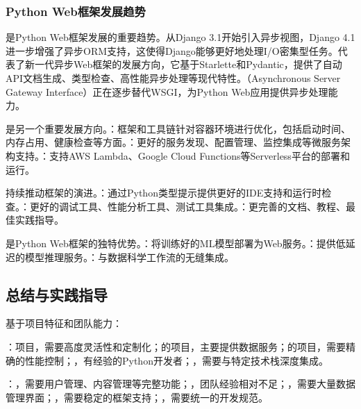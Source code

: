 \hypertarget{python-webux6846ux67b6ux53d1ux5c55ux8d8bux52bf}{%
\subsubsection{Python Web框架发展趋势}\label{python-webux6846ux67b6ux53d1ux5c55ux8d8bux52bf}}

是Python Web框架发展的重要趋势。从Django 3.1开始引入异步视图，Django 4.1进一步增强了异步ORM支持，这使得Django能够更好地处理I/O密集型任务。代表了新一代异步Web框架的发展方向，它基于Starlette和Pydantic，提供了自动API文档生成、类型检查、高性能异步处理等现代特性。（Asynchronous Server Gateway Interface）正在逐步替代WSGI，为Python Web应用提供异步处理能力。

是另一个重要发展方向。：框架和工具链针对容器环境进行优化，包括启动时间、内存占用、健康检查等方面。：更好的服务发现、配置管理、监控集成等微服务架构支持。：支持AWS Lambda、Google Cloud Functions等Serverless平台的部署和运行。

持续推动框架的演进。：通过Python类型提示提供更好的IDE支持和运行时检查。：更好的调试工具、性能分析工具、测试工具集成。：更完善的文档、教程、最佳实践指导。

是Python Web框架的独特优势。：将训练好的ML模型部署为Web服务。：提供低延迟的模型推理服务。：与数据科学工作流的无缝集成。

\hypertarget{ux603bux7ed3ux4e0eux5b9eux8df5ux6307ux5bfc}{%
\subsection{总结与实践指导}\label{ux603bux7ed3ux4e0eux5b9eux8df5ux6307ux5bfc}}

基于项目特征和团队能力：

：项目，需要高度灵活性和定制化；的项目，主要提供数据服务；的项目，需要精确的性能控制；，有经验的Python开发者；，需要与特定技术栈深度集成。

：，需要用户管理、内容管理等完整功能；，团队经验相对不足；，需要大量数据管理界面；，需要稳定的框架支持；，需要统一的开发规范。

